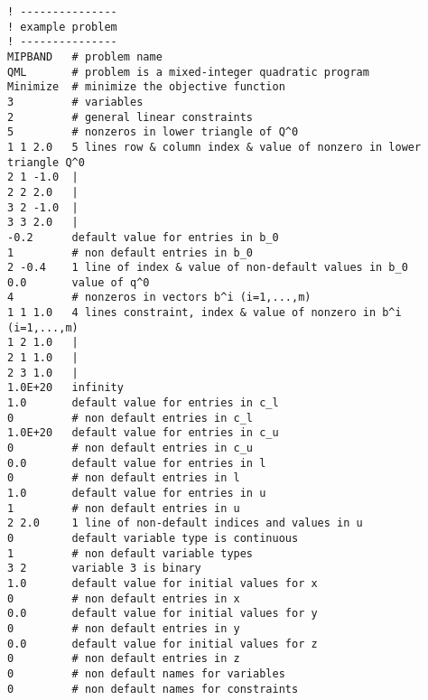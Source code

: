 {\small
\begin{verbatim}
! ---------------
! example problem
! ---------------
MIPBAND   # problem name
QML       # problem is a mixed-integer quadratic program
Minimize  # minimize the objective function
3         # variables
2         # general linear constraints
5         # nonzeros in lower triangle of Q^0
1 1 2.0   5 lines row & column index & value of nonzero in lower triangle Q^0
2 1 -1.0  |
2 2 2.0   |
3 2 -1.0  |
3 3 2.0   |
-0.2      default value for entries in b_0
1         # non default entries in b_0
2 -0.4    1 line of index & value of non-default values in b_0
0.0       value of q^0
4         # nonzeros in vectors b^i (i=1,...,m)
1 1 1.0   4 lines constraint, index & value of nonzero in b^i (i=1,...,m)
1 2 1.0   |
2 1 1.0   |
2 3 1.0   |
1.0E+20   infinity
1.0       default value for entries in c_l
0         # non default entries in c_l
1.0E+20   default value for entries in c_u
0         # non default entries in c_u
0.0       default value for entries in l
0         # non default entries in l
1.0       default value for entries in u
1         # non default entries in u
2 2.0     1 line of non-default indices and values in u
0         default variable type is continuous
1         # non default variable types
3 2       variable 3 is binary
1.0       default value for initial values for x
0         # non default entries in x
0.0       default value for initial values for y
0         # non default entries in y
0.0       default value for initial values for z
0         # non default entries in z
0         # non default names for variables
0         # non default names for constraints
\end{verbatim}
}
